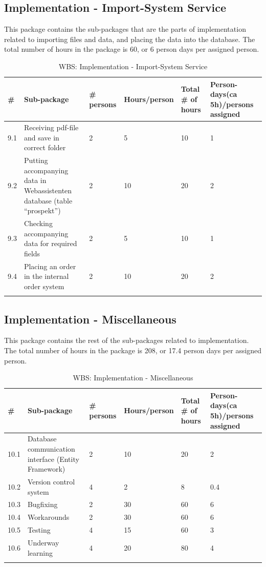 \subsection{Implementation - Import-System Service}
This package contains the sub-packages that are the parts of implementation related to importing files and data, and placing the data into the database. The total number of hours in the package is 60, or 6 person days per assigned person.
\begin{longtable}{|p{0.7cm}|p{3cm}|p{1.8cm}|p{2.5cm}|p{2cm}|p{2.8cm}|}
\hline
\# & Sub-package & \# persons & Hours/person & Total \# of hours & Person-days(ca 5h)/persons assigned\\ 
\hline
9.1 & Receiving pdf-file and save in correct folder & 2 & 5 & 10 & 1\\ 
\hline
9.2 & Putting accompanying data in Webassistenten database (table “prospekt”) & 2 & 10 & 20 & 2\\ 
\hline
9.3 & Checking accompanying data for required fields & 2 & 5 & 10 & 1\\ 
\hline
9.4 & Placing an order in the internal order system & 2 & 10 & 20 & 2\\ 
\hline\caption{WBS: Implementation - Import-System Service}
\end{longtable}

\subsection{Implementation - Miscellaneous}
This package contains the rest of the sub-packages related to implementation. The total number of hours in the package is 208, or 17.4 person days per assigned person.
\begin{longtable}{|p{0.7cm}|p{3cm}|p{1.8cm}|p{2.5cm}|p{2cm}|p{2.8cm}|}
\hline
\# & Sub-package & \# persons & Hours/person & Total \# of hours & Person-days(ca 5h)/persons assigned\\ 
\hline
10.1 & Database communication interface (Entity Framework) & 2 & 10 & 20 & 2\\ 
\hline
10.2 & Version control system & 4 & 2 & 8 & 0.4\\ 
\hline
10.3 & Bugfixing & 2 & 30 & 60 & 6\\ 
\hline
10.4 & Workarounds & 2 & 30 & 60 & 6\\ 
\hline
10.5 & Testing & 4 & 15 & 60 & 3\\ 
\hline
10.6 & Underway learning & 4 & 20 & 80 & 4\\ 
\hline
\caption{WBS: Implementation - Miscellaneous}
\end{longtable}

